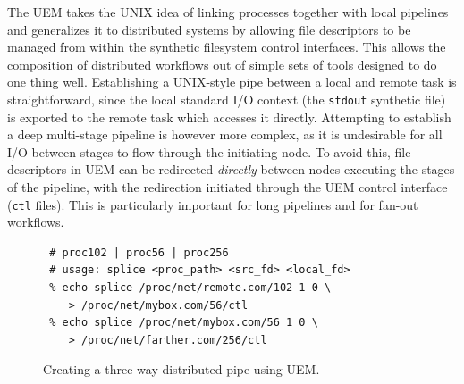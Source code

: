 \documentclass{sig-alternate}
\begin{document}

The UEM takes the UNIX idea of linking processes together with
local pipelines and generalizes it to distributed systems by allowing
file descriptors to be managed from within the synthetic filesystem 
control interfaces.
This allows the composition of distributed workflows out of simple
sets of tools designed to do one thing well.
Establishing a UNIX-style pipe between a local and remote task is
straightforward, since the local standard I/O context (the {\tt stdout} synthetic file) is exported
to the remote task which accesses it directly.  Attempting to establish a deep multi-stage
pipeline is however more complex, as it is undesirable for all I/O between stages to flow through the
initiating node.
To avoid this, file descriptors in UEM can be redirected {\it directly} between nodes executing 
the stages of the pipeline, with the redirection initiated through the UEM control interface ({\tt ctl} files).  This is particularly important for long pipelines
and for fan-out workflows.


\begin{figure}
\begin{center}
\begin{verbatim}
 # proc102 | proc56 | proc256
 # usage: splice <proc_path> <src_fd> <local_fd>
 % echo splice /proc/net/remote.com/102 1 0 \
    > /proc/net/mybox.com/56/ctl
 % echo splice /proc/net/mybox.com/56 1 0 \
    > /proc/net/farther.com/256/ctl
\end{verbatim}
\end{center}
\vspace{-0.1in}
\caption{Creating a three-way distributed pipe using UEM.}
\label{fig:splicex}
\end{figure}
\end{document}

